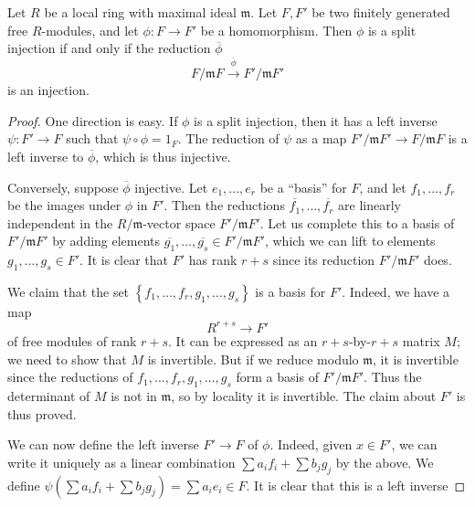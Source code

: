 \begin{proposition} \label{splitcriterion1}
Let $R$ be a local ring with maximal ideal $\mathfrak{m}$. Let $F, F'$ be two
finitely generated free $R$-modules, and let $\phi: F \to F'$ be a homomorphism. 
Then $\phi$ is a split injection if and only if the reduction $\overline{\phi}$
\[ F/\mathfrak{m}F \stackrel{\overline{\phi}}{\to} F'/\mathfrak{m}F'  \]
is an injection. 
\end{proposition}
\begin{proof} 
One direction is easy. If $\phi$ is a split injection, then it has a left
inverse
$\psi: F' \to F$ such that $\psi \circ \phi = 1_F$. The reduction of $\psi$ as a
map $F'/\mathfrak{m}F' \to F/\mathfrak{m}F$ is a left inverse to
$\overline{\phi}$, which is thus injective.

Conversely, suppose $\overline{\phi}$ injective. Let $e_1, \dots, e_r$ be a
``basis'' for $F$, and let $f_1, \dots, f_r$ be the images under $\phi$ in
$F'$. Then the reductions $\overline{f_1}, \dots, \overline{f_r}$ are linearly
independent in the $R/\mathfrak{m}$-vector space $F'/\mathfrak{m}F'$. Let us
complete this to a basis of $F'/\mathfrak{m}F'$ by adding elements
$\overline{g_1}, \dots, \overline{g_s} \in F'/\mathfrak{m}F'$, which we can
lift to elements $g_1, \dots, g_s \in F'$. It is clear that $F'$ has rank $r+s $
since its reduction $F'/\mathfrak{m}F'$ does.

We claim that the set $\left\{f_1, \dots, f_r, g_1, \dots, g_s\right\}$ is a
basis for $F'$. Indeed, we have a map 
\[ R^{r+s} \to F'  \]
of free modules of rank $r+s$. It can be expressed as an $r+s$-by-$r+s$ matrix
$M$; we need to show that $M$ is invertible. But if we reduce modulo
$\mathfrak{m}$, it is invertible since the reductions of $f_1, \dots, f_r,
g_1, \dots, g_s$ form a basis of $F'/\mathfrak{m}F'$. 
Thus the determinant of $M$ is not in $\mathfrak{m}$, so by locality it is
invertible. 
The claim about $F'$ is thus proved.

We can now define the left inverse $F' \to F$ of $\phi$. Indeed, given $x \in F'$,
we can write it uniquely as a linear combination $\sum a_i f_i + \sum b_j g_j$
by the above. We define $\psi(\sum a_i f_i + \sum b_j g_j) = \sum a_i e_i \in
F$. It is clear that this is a left inverse
\end{proof} 

